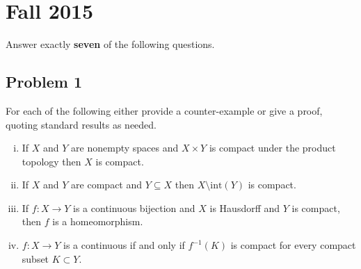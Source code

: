 \documentclass[12pt]{article}
\newcommand\inv[1]{#1^{-1}}
\theoremstyle{definition}
\begin{document}
\section{Fall 2015}
Answer exactly \textbf{seven} of the following questions.
\subsection{Problem 1}
For each of the following either provide a counter-example or give a proof, quoting standard results as needed.
\begin{enumerate}[(i)]
    \item If $X$ and $Y$ are nonempty spaces and $X \times Y$ is compact under the product topology then $X$ is compact.
    \item If $X$ and $Y$ are compact and $Y \subseteq X$ then $X \setminus \mathrm{int}(Y)$ is compact.
    \item If $f : X \to Y$ is a continuous bijection and $X$ is Hausdorff and $Y$ is compact, then $f$ is a homeomorphism.
    \item $f : X \to Y$ is a continuous if and only if $\inv{f}(K)$ is compact for every compact subset $K \subset Y$.
\end{enumerate}
\end{document}
